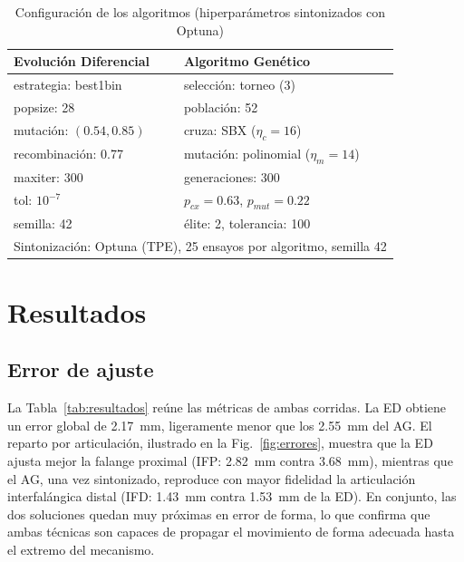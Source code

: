 \documentclass[conference]{IEEEtran}
\begin{document}
\begin{table}[htbp]
\caption{Configuración de los algoritmos (hiperparámetros sintonizados con Optuna)}
\begin{center}
\begin{tabular}{|l|l|}
\hline
\textbf{Evolución Diferencial} & \textbf{Algoritmo Genético} \\
\hline
estrategia: best1bin & selección: torneo (3) \\
\hline
popsize: 28 & población: 52 \\
\hline
mutación: $(0.54,0.85)$ & cruza: SBX ($\eta_c=16$) \\
\hline
recombinación: 0.77 & mutación: polinomial ($\eta_m=14$) \\
\hline
maxiter: 300 & generaciones: 300 \\
\hline
tol: $10^{-7}$ & $p_{cx}=0.63$, $p_{mut}=0.22$ \\
\hline
semilla: 42 & élite: 2, tolerancia: 100 \\
\hline
\multicolumn{2}{|l|}{Sintonización: Optuna (TPE), 25 ensayos por algoritmo, semilla 42} \\
\hline
\end{tabular}
\label{tab:config}
\end{center}
\end{table}

\section{Resultados}
\subsection{Error de ajuste}
La Tabla~\ref{tab:resultados} reúne las métricas de ambas corridas. La ED obtiene
un error global de 2.17~mm, ligeramente menor que los 2.55~mm del AG. El reparto
por articulación, ilustrado en la Fig.~\ref{fig:errores}, muestra que la ED
ajusta mejor la falange proximal (IFP: 2.82~mm contra 3.68~mm), mientras que el
AG, una vez sintonizado, reproduce con mayor fidelidad la articulación
interfalángica distal (IFD: 1.43~mm contra 1.53~mm de la ED). En conjunto, las dos soluciones quedan
muy próximas en error de forma, lo que confirma que ambas técnicas son
capaces de propagar el movimiento de forma adecuada hasta el extremo del
mecanismo.
\end{document}
